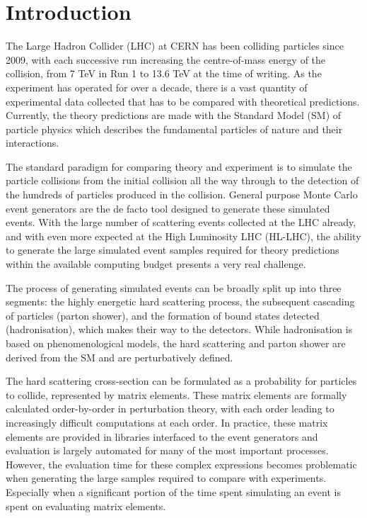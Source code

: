 \documentclass[main.tex]{subfiles}
\begin{document}
\chapter{Introduction}
\label{chapter:intro}

The Large Hadron Collider (LHC) at CERN has been colliding
particles since 2009, with each successive run increasing the centre-of-mass
energy of the collision, from 7 TeV in Run 1 to 13.6 TeV
at the time of writing. As the experiment has
operated for over a decade, there is a vast quantity of
experimental data collected that has to be compared with
theoretical predictions. Currently, the theory predictions
are made with the Standard Model (SM) of
particle physics which describes the fundamental particles
of nature and their interactions.

The standard paradigm for comparing
theory and experiment is to simulate the particle collisions
from the initial collision all the way through
to the detection of the hundreds of particles produced in the collision.
General purpose Monte Carlo event generators are the de facto
tool designed to generate these simulated events.
With the large number of scattering events collected at
the LHC already, and with even more expected at the High Luminosity LHC (HL-LHC),
the ability to generate the large simulated event samples
required for theory predictions within the available computing
budget presents a very real challenge.

The process of generating simulated events can be broadly
split up into three segments:
the highly energetic hard scattering process, 
the subsequent cascading of particles (parton shower),
and the formation of bound states detected (hadronisation),
which makes their way to the detectors.
While hadronisation is based on phenomenological models,
the hard scattering and parton shower are derived
from the SM and are perturbatively defined.

The hard scattering cross-section can be formulated as a probability
for particles to collide, represented by matrix elements.
These matrix elements are formally calculated order-by-order
in perturbation theory, with each order leading
to increasingly difficult computations at each order. In practice,
these matrix elements are provided in libraries interfaced
to the event generators and evaluation is largely automated for many
of the most important processes. However, the evaluation time
for these complex expressions becomes problematic
when generating the large samples required to compare with
experiments. Especially when a significant portion of the time
spent simulating an event is spent on evaluating matrix
elements.
\end{document}
